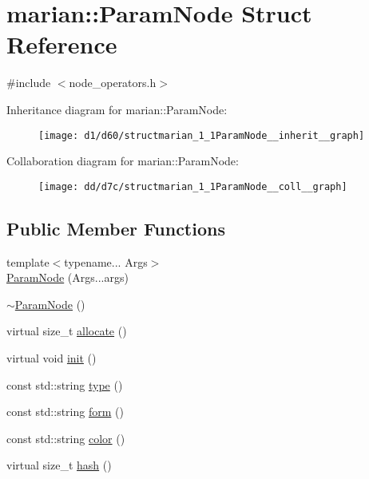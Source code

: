 \hypertarget{structmarian_1_1ParamNode}{}\section{marian\+:\+:Param\+Node Struct Reference}
\label{structmarian_1_1ParamNode}


{\ttfamily \#include $<$node\+\_\+operators.\+h$>$}



Inheritance diagram for marian\+:\+:Param\+Node\+:
\nopagebreak
\begin{figure}[H]
\begin{center}
\leavevmode
\texttt{[image: d1/d60/structmarian\_1\_1ParamNode\_\_inherit\_\_graph]}
\end{center}
\end{figure}


Collaboration diagram for marian\+:\+:Param\+Node\+:
\nopagebreak
\begin{figure}[H]
\begin{center}
\leavevmode
\texttt{[image: dd/d7c/structmarian\_1\_1ParamNode\_\_coll\_\_graph]}
\end{center}
\end{figure}
\subsection*{Public Member Functions}
\begin{DoxyCompactItemize}
\item 
{\footnotesize template$<$typename... Args$>$ }\\\hyperlink{structmarian_1_1ParamNode_aa452140f55ba4ede7b98f36bfd772c04}{Param\+Node} (Args...\+args)
\item 
\hyperlink{structmarian_1_1ParamNode_a330a050f63c33ca3b0efa8bd16d7f969}{$\sim$\+Param\+Node} ()
\item 
virtual size\+\_\+t \hyperlink{structmarian_1_1ParamNode_a3b95c7c7a19f6ae26b0001b15e9cffe6}{allocate} ()
\item 
virtual void \hyperlink{structmarian_1_1ParamNode_a3d6c140ce46f6c97912fa4de460752cc}{init} ()
\item 
const std\+::string \hyperlink{structmarian_1_1ParamNode_aecb590c68e3996b385779f896639036e}{type} ()
\item 
const std\+::string \hyperlink{structmarian_1_1ParamNode_a8ed000b20face6bd31bdb9af750c56b0}{form} ()
\item 
const std\+::string \hyperlink{structmarian_1_1ParamNode_aead6b45314b0b5a53c998acf994db204}{color} ()
\item 
virtual size\+\_\+t \hyperlink{structmarian_1_1ParamNode_a851c5d3d18a4fbde8e84c2a2f758e200}{hash} ()
\end{DoxyCompactItemize}
